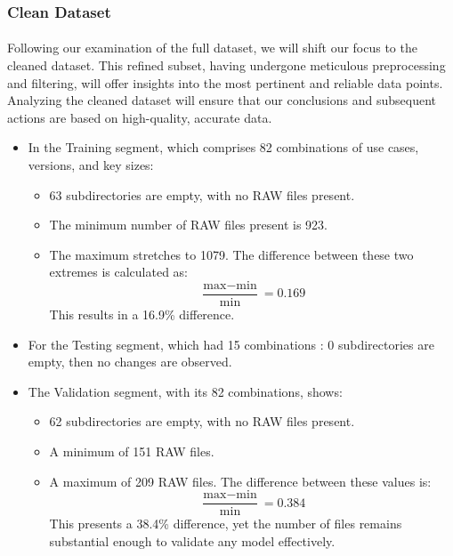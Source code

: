         \subsubsection{Clean Dataset}
            \paragraph{}Following our examination of the full dataset, we will shift our focus to the cleaned dataset. This refined subset, having undergone meticulous preprocessing and filtering, will offer insights into the most pertinent and reliable data points. Analyzing the cleaned dataset will ensure that our conclusions and subsequent actions are based on high-quality, accurate data.
            
            \begin{itemize}
                \item In the Training segment, which comprises 82 combinations of use cases, versions, and key sizes:
                
                \begin{itemize}
                    \item 63 subdirectories are empty, with no RAW files present.
                    \item The minimum number of RAW files present is 923.
                    \item The maximum stretches to 1079. The difference between these two extremes is calculated as:
                    \begin{equation}
                        \frac{\text{max} - \text{min}}{\text{min}} = 0.169
                    \end{equation}
                    This results in a 16.9\% difference.
                \end{itemize}
                \item For the Testing segment, which had 15 combinations : 0 subdirectories are empty, then no changes are observed.
                \item The Validation segment, with its 82 combinations, shows:
                \begin{itemize}
                    \item 62 subdirectories are empty, with no RAW files present.
                    \item A minimum of 151 RAW files.
                    \item A maximum of 209 RAW files. The difference between these values is:
                    \begin{equation}
                        \frac{\text{max} - \text{min}}{\text{min}} = 0.384
                    \end{equation}
                    This presents a 38.4\% difference, yet the number of files remains substantial enough to validate any model effectively.
                \end{itemize}
            \end{itemize}
            
